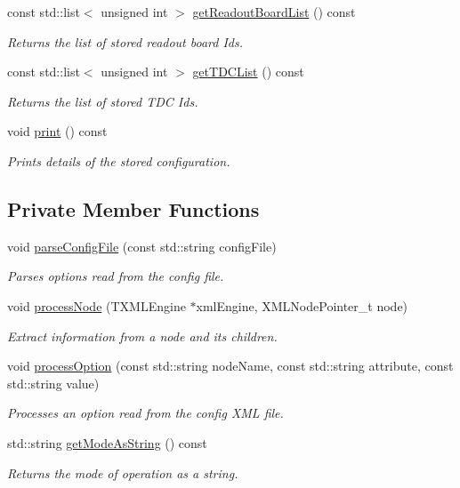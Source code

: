 \begin{DoxyCompactItemize}
const std\+::list$<$ unsigned int $>$ \hyperlink{class_config_a197838ef4fbdf274759c01f612666e93}{get\+Readout\+Board\+List} () const
\begin{DoxyCompactList}\small\item\em Returns the list of stored readout board Ids. \end{DoxyCompactList}\item 
const std\+::list$<$ unsigned int $>$ \hyperlink{class_config_a847bc1cf36b3d12da8590a036634a150}{get\+T\+D\+C\+List} () const
\begin{DoxyCompactList}\small\item\em Returns the list of stored T\+DC Ids. \end{DoxyCompactList}\item 
void \hyperlink{class_config_af75cb5a60c6cac9d6f6d030e65a5240a}{print} () const
\begin{DoxyCompactList}\small\item\em Prints details of the stored configuration. \end{DoxyCompactList}\end{DoxyCompactItemize}
\subsection*{Private Member Functions}
\begin{DoxyCompactItemize}
\item 
void \hyperlink{class_config_a3092a6e3ba0458b6bedca09f841f554e}{parse\+Config\+File} (const std\+::string config\+File)
\begin{DoxyCompactList}\small\item\em Parses options read from the config file. \end{DoxyCompactList}\item 
void \hyperlink{class_config_a46d81f90a7b6218385e8bfd0a283f6ce}{process\+Node} (T\+X\+M\+L\+Engine $\ast$xml\+Engine, X\+M\+L\+Node\+Pointer\+\_\+t node)
\begin{DoxyCompactList}\small\item\em Extract information from a node and its children. \end{DoxyCompactList}\item 
void \hyperlink{class_config_a5f1048494003d7deb4edd9064fc6e9c5}{process\+Option} (const std\+::string node\+Name, const std\+::string attribute, const std\+::string value)
\begin{DoxyCompactList}\small\item\em Processes an option read from the config X\+ML file. \end{DoxyCompactList}\item 
std\+::string \hyperlink{class_config_a3bd48a0ae54bfd982c02564160d6762b}{get\+Mode\+As\+String} () const
\begin{DoxyCompactList}\small\item\em Returns the mode of operation as a string. \end{DoxyCompactList}\end{DoxyCompactItemize}

